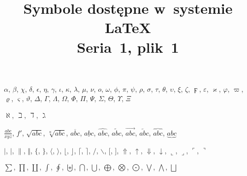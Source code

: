 \documentclass[a4paper,11pt]{article}
\title{Symbole dostępne w~systemie \LaTeX \\
  {\Large Seria~1, plik~1}}
\begin{document}





\maketitle





\noindent
$\alpha$, $\beta$, $\chi$, $\delta$, $\epsilon$, $\eta$, $\gamma$, $\iota$, $\kappa$, $\lambda$, $\mu$, $\nu$, $o$, $\omega$,
$\phi$, $\pi$, $\psi$, $\rho$, $\sigma$, $\tau$, $\theta$, $\upsilon$, $\xi$, $\zeta$, $\digamma$, $\varepsilon$,
$\varkappa$, $\varphi$, $\varpi$, $\varrho$, $\varsigma$, $\vartheta$, $\Delta$, $\Gamma$, $\Lambda$, $\Omega$, $\Phi$, $\Pi$,
$\Psi$, $\Sigma$, $\Theta$, $\Upsilon$, $\Xi$

\vspace{1em}





\noindent
$\aleph$, $\beth$, $\daleth$, $\gimel$

\vspace{1em}





\noindent
$\frac{ abc }{ xyz }$, $f'$, $\sqrt{ abc }$, $\sqrt[n]{ abc }$,
$\overline{ abc }$, $\underline{ abc }$, $\widehat{ abc }$,
$\widetilde{ abc }$, $\overrightarrow{ abc }$,
$\overleftarrow{ abc }$, $\overbrace{ abc }$, $\underbrace{ abc }$

\vspace{1em}





\noindent
$|$, $\vert$, $\|$, $\Vert$, $\{$, $\}$, $\langle$, $\rangle$, $\lfloor$, $\rfloor$, $\lceil$, $\rceil$, $/$,
$\backslash$, $[$, $]$, $\Uparrow$, $\uparrow$, $\Downarrow$, $\downarrow$, $\llcorner$, $\lrcorner$, $\ulcorner$, $\urcorner$

\vspace{1em}





\noindent
$\sum$, $\prod$, $\coprod$, $\int$, $\oint$, %
$\biguplus$, $\bigcap$, $\bigcup$, $\bigoplus$, $\bigotimes$, $\bigodot$, $\bigvee$, $\bigwedge$, $\bigsqcup$
\end{document}
